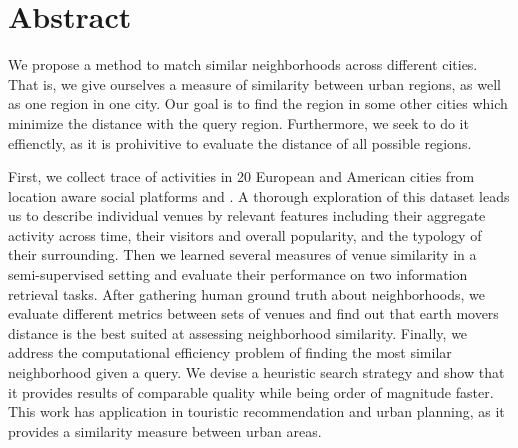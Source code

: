 \begingroup
\let\clearpage\relax

\chapter*{Abstract}

We propose a method to match similar neighborhoods across different cities.
That is, we give ourselves a measure of similarity between urban regions, as
well as one region in one city. Our goal is to find the region in some other
cities which minimize the distance with the query region. Furthermore, we
seek to do it effienctly, as it is prohivitive to evaluate the distance of
all possible regions.

First, we collect trace of activities in 20 European and American cities from
location aware social platforms \fs{} and \flickr{}. A thorough exploration of
this dataset leads us to describe individual venues by relevant features
including their aggregate activity across time, their visitors and overall
popularity, and the typology of their surrounding.  Then we learned several
measures of venue similarity in a semi-supervised setting and evaluate their
performance on two information retrieval tasks.  After gathering human ground
truth about neighborhoods, we evaluate different metrics between sets of
venues and find out that earth movers distance is the best suited at assessing
neighborhood similarity. Finally, we address the computational efficiency
problem of finding the most similar neighborhood given a query. We devise a
heuristic search strategy and show that it provides results of comparable
quality while being order of magnitude faster. This work has application in
touristic recommendation and urban planning, as it provides a similarity
measure between urban areas.

\endgroup 
\vfill
